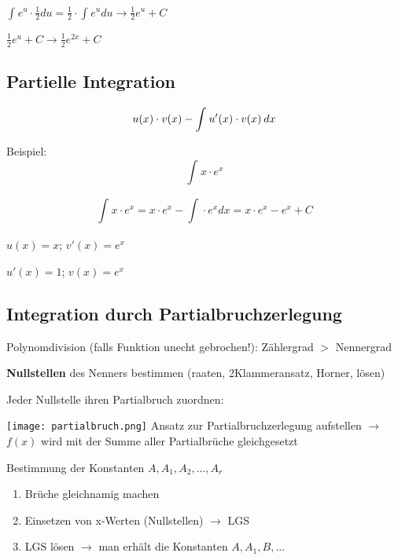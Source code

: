 \begin{multicols*}{3}
\begin{multicols*}{2}
    \end{multicols*}

    { $ \int_{}{}e^u \cdot  \frac{1}{2}du = \frac{1}{2} \cdot  \int_{}{}e^u du \rightarrow \frac{1}{2} e^u + C   $}


    { $\frac{1}{2} e^u + C \rightarrow \frac{1}{2} e^{2x} + C$ }




    \subsection{Partielle Integration}
    {\large $$u(x)\cdot v(x) - \int_{}^{}u'(x) \cdot v(x) \hspace{2px}  dx$$}

    \begin{multicols*}{2}
        {Beispiel:}
        \[ \int_{}{}x\cdot e^x\]

        $$ \int_{}{}x\cdot e^x = x\cdot e^x -  \int_{}{}\cdot e^x dx = x\cdot e^x - e^x + C $$
        \columnbreak

        {$u(x)=x$; $v'(x)=e^x$}

        {$u'(x)=1$; $v(x)=e^x$}

    \end{multicols*}


    \vfill\null
    \columnbreak


    \subsection{Integration durch Partialbruchzerlegung}
    {    Polynomdivision (falls Funktion unecht gebrochen!): Zählergrad  $>$ Nennergrad }



    { \textbf{Nullstellen} des Nenners bestimmen (raaten, 2Klammeransatz, Horner, lösen)}

    { Jeder Nullstelle ihren Partialbruch zuordnen:}

    \texttt{[image: partialbruch.png]}
    { Ansatz zur Partialbruchzerlegung aufstellen $\rightarrow$ $f(x)$ wird mit der Summe aller Partialbrüche gleichgesetzt}

    { Bestimmung der Konstanten $A,A_1,A_2,...,A_r$}
    \begin{enumerate}
        \itemsep0em
        \item Brüche gleichnamig machen
        \item Einsetzen von x-Werten (Nullstellen) $\rightarrow$ LGS
        \item LGS lösen $\rightarrow$ man erhält die Konstanten $A,A_1,B,...$
    \end{enumerate}



\end{multicols*}
